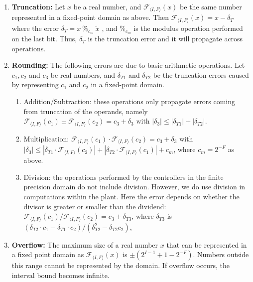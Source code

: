 \begin{enumerate}

\item {\bf Truncation:} Let $x$ be a real number, and $\mathcal{F}_{\langle
I,F \rangle}(x)$ be the same number represented in a fixed-point domain as
above.  Then $\mathcal{F}_{\langle I,F \rangle}(x) = x-\delta_T$ where the
error $ \delta_T=x\ \%_{c_m}\ \tilde x$ , and $\%_{c_m}$ is the modulus
operation performed on the last bit. 
Thus, $\delta_T$ is the truncation error and it will propagate across
operations.
%
\item {\bf Rounding:} The following errors are due to basic arithmetic operations.  
Let $c_1, c_2$ and $c_3$ be real numbers, and $\delta_{T1}$ and $\delta_{T2}$ be
the truncation errors caused by representing $c_1$ and $c_2$ in a fixed-point domain.
%
\begin{enumerate}
%
\item Addition/Subtraction: these operations only propagate errors coming
from truncation of the operands, namely $\mathcal{F}_{\langle I,F
\rangle}(c_1) \pm \mathcal{F}_{\langle I,F \rangle}(c_2) = c_3 + \delta_3$
with $|\delta_3| \leq |\delta_{T1}| + |\delta_{T2}|$.
%
\item Multiplication: $\mathcal{F}_{\langle I,F \rangle}(c_1) \cdot
\mathcal{F}_{\langle I,F \rangle}(c_2) =  c_3 + \delta_3$ with $|\delta_3|
\leq |\delta_{T1}\cdot\mathcal{F}_{\langle I,F \rangle}(c_2)|\allowbreak +
|\delta_{T2}\cdot\mathcal{F}_{\langle I,F \rangle}(c_1)| + c_m$, where
$c_m=2^{-F}$ as above.
%
\item Division: the operations performed by the controllers in the finite precision
domain do not include division.  However, we do use division in computations within the plant.  
Here the error depends on whether the divisor is greater or smaller than the dividend:  $\mathcal{F}_{\langle I,F
\rangle}(c_1) / \mathcal{F}_{\langle I,F \rangle}(c_2) = c_3 + \delta_{T3}$, 
where $\delta_{T3}$ is $(\delta_{T2}\cdot c_1 - \delta_{T1}\cdot
c_2)/(\delta_{T2}^2 - \delta_{T2} c_2)$,
%
\end{enumerate}

\item {\bf Overflow:}
The maximum size of a real number $x$ that can be represented in a fixed
point domain as $\mathcal{F}_{\langle I,F \rangle}(x)$ is $\pm
(2^{I-1}+1-2^{-F})$.  Numbers outside this range cannot be represented by
the domain.  If overflow occurs, the interval bound becomes infinite.

\end{enumerate}

